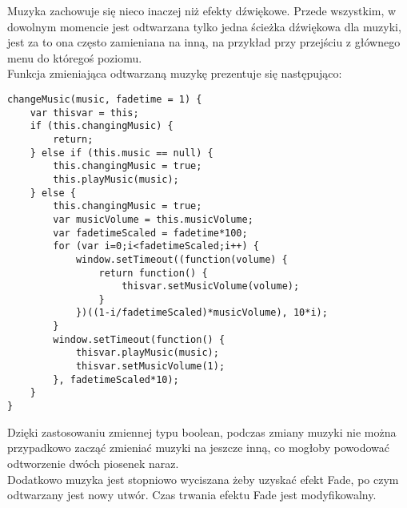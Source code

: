 \smallskip

Muzyka zachowuje się nieco inaczej niż efekty dźwiękowe. Przede wszystkim, w dowolnym momencie jest odtwarzana tylko jedna \'scieżka dźwiękowa dla muzyki, jest za to ona często zamieniana na inną, na przykład przy przej\'sciu z głównego menu do którego\'s poziomu.\\
Funkcja zmieniająca odtwarzaną muzykę prezentuje się następująco:
\begin{lstlisting}
changeMusic(music, fadetime = 1) {
	var thisvar = this;
	if (this.changingMusic) {
		return;
	} else if (this.music == null) {
		this.changingMusic = true;
		this.playMusic(music);
	} else {
		this.changingMusic = true;
		var musicVolume = this.musicVolume;
		var fadetimeScaled = fadetime*100;
		for (var i=0;i<fadetimeScaled;i++) {
			window.setTimeout((function(volume) {
				return function() {
					thisvar.setMusicVolume(volume);
				}
			})((1-i/fadetimeScaled)*musicVolume), 10*i);
		}
		window.setTimeout(function() {
			thisvar.playMusic(music);
			thisvar.setMusicVolume(1);
		}, fadetimeScaled*10);
	}
}
\end{lstlisting}
Dzięki zastosowaniu zmiennej typu boolean, podczas zmiany muzyki nie można przypadkowo zacząć zmieniać muzyki na jeszcze inną, co mogłoby powodować odtworzenie dwóch piosenek naraz.\\
Dodatkowo muzyka jest stopniowo wyciszana żeby uzyskać efekt Fade, po czym odtwarzany jest nowy utwór. Czas trwania efektu Fade jest modyfikowalny.
\cleardoublepage